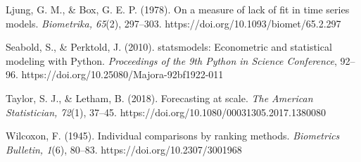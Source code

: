 \documentclass[
  spanish,
  11pt,
]{article}
\begin{document}
Ljung, G. M., \& Box, G. E. P. (1978). On a measure of lack of fit in
time series models. \emph{Biometrika, 65}(2), 297–303.
https://doi.org/10.1093/biomet/65.2.297

Seabold, S., \& Perktold, J. (2010). statsmodels: Econometric and
statistical modeling with Python. \emph{Proceedings of the 9th Python in
Science Conference}, 92–96. https://doi.org/10.25080/Majora-92bf1922-011

Taylor, S. J., \& Letham, B. (2018). Forecasting at scale. \emph{The
American Statistician, 72}(1), 37–45.
https://doi.org/10.1080/00031305.2017.1380080

Wilcoxon, F. (1945). Individual comparisons by ranking methods.
\emph{Biometrics Bulletin, 1}(6), 80–83. https://doi.org/10.2307/3001968
\end{document}
